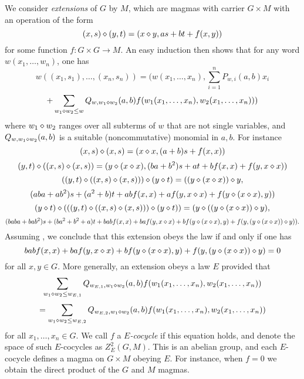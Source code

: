 We consider \emph{extensions} of $G$ by $M$, which are magmas with carrier $G \times M$ with an operation of the form
\begin{equation}\label{extension}
  (x,s) \diamond (y,t) = (x \diamond y, as + bt + f(x,y))
\end{equation}
for some function $f: G \times G \to M$.  An easy induction then shows that for any word $w(x_1,\dots,w_n)$, one has
$$ w((x_1,s_1),\dots,(x_n,s_n)) = (w(x_1,\dots,x_n), \sum_{i=1}^n P_{w,i}(a,b) x_i$$
$$ + \sum_{w_1 \diamond w_2 \leq w} Q_{w,w_1 \diamond w_2}(a,b) f(w_1(x_1,\dots,x_n), w_2(x_1,\dots,x_n)))$$
where $w_1 \diamond w_2$ ranges over all subterms of $w$ that are not single variables, and $Q_{w,w_1 \diamond w_2}(a,b)$ is a suitable (noncommutative) monomial in $a,b$.  For instance
$$ (x,s) \diamond (x,s) = (x \diamond x, (a+b) s + f(x,x))$$
$$ (y,t) \diamond ((x,s) \diamond (x,s)) = (y \diamond (x \diamond x), (ba+b^2) s + at + b f(x,x) + f(y, x \diamond x))$$
$$ ((y,t) \diamond ((x,s) \diamond (x,s))) \diamond (y \diamond t) = ((y \diamond (x \diamond x)) \diamond y,$$
$$ (aba+ab^2) s + (a^2+b)t + ab f(x,x) + a f(y, x \diamond x) + f(y \diamond (x \diamond x), y))$$
$$ (y \diamond t) \diamond (((y,t) \diamond ((x,s) \diamond (x,s))) \diamond (y \diamond t)) = (y \diamond ((y \diamond (x \diamond x)) \diamond y), $$
$$(baba+bab^2) s + (ba^2+b^2+a)t + bab f(x,x) + ba f(y, x \diamond x) + bf(y \diamond (x \diamond x), y) + f( y, (y \diamond (x \diamond x)) \diamond y)).$$
Assuming , we conclude that this extension obeys the law  if and only if one has
\begin{equation}\label{cocycle-1110}
  bab f(x,x) + ba f(y, x \diamond x) + bf(y \diamond (x \diamond x), y) + f( y, (y \diamond (x \diamond x)) \diamond y) = 0
\end{equation}
for all $x,y \in G$.  More generally, an extension obeys a law $E$ provided that
$$ \sum_{w_1 \diamond w_2 \leq w_{E,1}} Q_{w_{E,1},w_1 \diamond w_2}(a,b) f(w_1(x_1,\dots,x_n), w_2(x_1,\dots,x_n))$$
$$= \sum_{w_1 \diamond w_2 \leq w_{E,2}} Q_{w_{E,2},w_1 \diamond w_2}(a,b) f(w_1(x_1,\dots,x_n), w_2(x_1,\dots,x_n))$$
for all $x_1,\dots,x_n \in G$.  We call $f$ a \emph{$E$-cocycle} if this equation holds, and denote the space of such $E$-cocycles as $Z^2_E(G,M)$.  This is an abelian group, and each $E$-cocycle defines a magma on $G \times M$ obeying $E$.  For instance, when $f=0$ we obtain the direct product of the $G$ and $M$ magmas.

